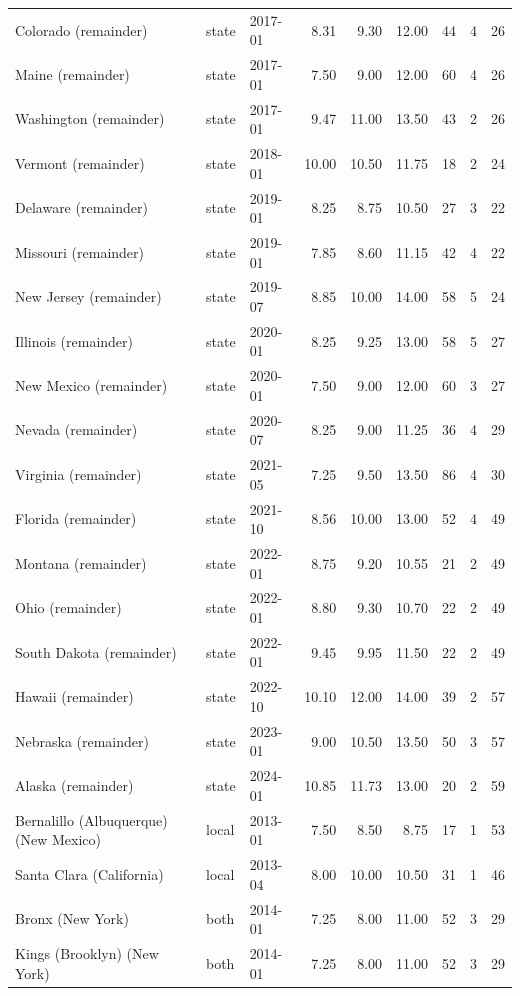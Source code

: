 \documentclass[12pt]{article}
\begin{document}
\begin{table}
\begin{tabular}{lllrrrrrr}
Colorado (remainder) & state & 2017-01 & 8.31 & 9.30 & 12.00 & 44 & 4 & 26 \\
Maine (remainder) & state & 2017-01 & 7.50 & 9.00 & 12.00 & 60 & 4 & 26 \\
Washington (remainder) & state & 2017-01 & 9.47 & 11.00 & 13.50 & 43 & 2 & 26 \\
Vermont (remainder) & state & 2018-01 & 10.00 & 10.50 & 11.75 & 18 & 2 & 24 \\
Delaware (remainder) & state & 2019-01 & 8.25 & 8.75 & 10.50 & 27 & 3 & 22 \\
Missouri (remainder) & state & 2019-01 & 7.85 & 8.60 & 11.15 & 42 & 4 & 22 \\
New Jersey (remainder) & state & 2019-07 & 8.85 & 10.00 & 14.00 & 58 & 5 & 24 \\
Illinois (remainder) & state & 2020-01 & 8.25 & 9.25 & 13.00 & 58 & 5 & 27 \\
New Mexico (remainder) & state & 2020-01 & 7.50 & 9.00 & 12.00 & 60 & 3 & 27 \\
Nevada (remainder) & state & 2020-07 & 8.25 & 9.00 & 11.25 & 36 & 4 & 29 \\
Virginia (remainder) & state & 2021-05 & 7.25 & 9.50 & 13.50 & 86 & 4 & 30 \\
Florida (remainder) & state & 2021-10 & 8.56 & 10.00 & 13.00 & 52 & 4 & 49 \\
Montana (remainder) & state & 2022-01 & 8.75 & 9.20 & 10.55 & 21 & 2 & 49 \\
Ohio (remainder) & state & 2022-01 & 8.80 & 9.30 & 10.70 & 22 & 2 & 49 \\
South Dakota (remainder) & state & 2022-01 & 9.45 & 9.95 & 11.50 & 22 & 2 & 49 \\
Hawaii (remainder) & state & 2022-10 & 10.10 & 12.00 & 14.00 & 39 & 2 & 57 \\
Nebraska (remainder) & state & 2023-01 & 9.00 & 10.50 & 13.50 & 50 & 3 & 57 \\
Alaska (remainder) & state & 2024-01 & 10.85 & 11.73 & 13.00 & 20 & 2 & 59 \\
Bernalillo (Albuquerque) (New Mexico) & local & 2013-01 & 7.50 & 8.50 & 8.75 & 17 & 1 & 53 \\
Santa Clara (California) & local & 2013-04 & 8.00 & 10.00 & 10.50 & 31 & 1 & 46 \\
Bronx (New York) & both & 2014-01 & 7.25 & 8.00 & 11.00 & 52 & 3 & 29 \\
Kings (Brooklyn) (New York) & both & 2014-01 & 7.25 & 8.00 & 11.00 & 52 & 3 & 29 \\

\end{tabular}
\end{table}
\end{document}

